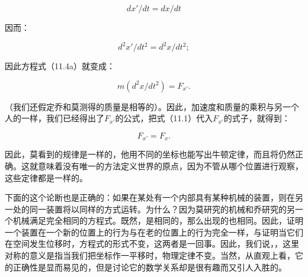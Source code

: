 \documentclass[12pt,oneside]{book}
\begin{document}
\begin{equation*}
dx'/dt=dx/dt
\end{equation*}

因而：

\begin{equation*}
d^2x'/dt^2=d^2x/dt^2;
\end{equation*}

因此方程式（11.4a）就变成：

\begin{equation*}
m(d^2x/dt^2)=F_{x'}.
\end{equation*}

（我们还假定乔和莫测得的质量是相等的）。因此，加速度和质量的乘积与另一个人的一样，我们已经得出了$F_{x'}$的公式，把式（11.1）代入$F_{x'}$的式子，就得到：


\begin{equation*}
F_{x'}=F_x.
\end{equation*}

因此，莫看到的规律是一样的，他用不同的坐标也能写出牛顿定律，而且将仍然正确。这就意味着没有唯一的方法定义世界的原点，因为不管从哪个位置进行观察，这些定律都是一样的。

下面的这个论断也是正确的：如果在某处有一个内部具有某种机械的装置，则在另一处的同一装置将以同样的方式运转。为什么？因为莫研究的机械和乔研究的另一个机械满足完全相同的方程式。既然，是相同的，那么出现的也相同。因此，证明一个装置在一个新的位置上的行为与在老的位置上的行为完全一样，与证明当它们在空间发生位移时，方程式的形式不变，这两者是一回事。因此，我们说，，这里对称的意义是指当我们把坐标作一平移时，物理定律不变。当然，从直观上看，它的正确性是显而易见的，但是讨论它的数学关系却是很有趣而又引人入胜的。
\end{document}

